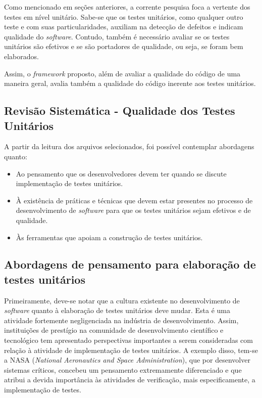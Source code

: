 Como mencionado em seções anteriores, a corrente pesquisa foca a vertente dos testes em nível unitário. Sabe-se que os testes unitários, como qualquer outro teste e com suas particularidades, auxiliam na detecção de defeitos e indicam qualidade do \textit{software}. Contudo, também é necessário avaliar se os testes unitários são efetivos e se são portadores de qualidade, ou seja, se foram bem elaborados.

Assim, o \textit{framework} proposto, além de avaliar a qualidade do código de uma maneira geral, avalia também a qualidade do código inerente aos testes unitários.

\subsection{Revisão Sistemática - Qualidade dos Testes Unitários}

A partir da leitura dos arquivos selecionados, foi possível contemplar abordagens quanto:

\begin{itemize}
	\item Ao pensamento que os desenvolvedores devem ter quando se discute implementação de testes unitários.
	\item À existência de práticas e técnicas que devem estar presentes no processo de desenvolvimento de \textit{software} para que os testes unitários sejam efetivos e de qualidade.
	\item Às ferramentas que apoiam a construção de testes unitários.
\end{itemize}

\subsection{Abordagens de pensamento para elaboração de testes unitários}

Primeiramente, deve-se notar que a cultura existente no desenvolvimento de \textit{software} quanto à elaboração de testes unitários deve mudar. Esta é uma atividade fortemente negligenciada na indústria de desenvolvimento. Assim, instituições de prestígio na comunidade de desenvolvimento científico e tecnológico tem apresentado perspectivas importantes a serem consideradas com relação à atividade de implementação de testes unitários. A exemplo disso, tem-se a NASA (\textit{National Aeronautics and Space Administration}), que por desenvolver sistemas críticos, concebeu um pensamento extremamente diferenciado e que atribui a devida importância às atividades de verificação, mais especificamente, a implementação de testes.


